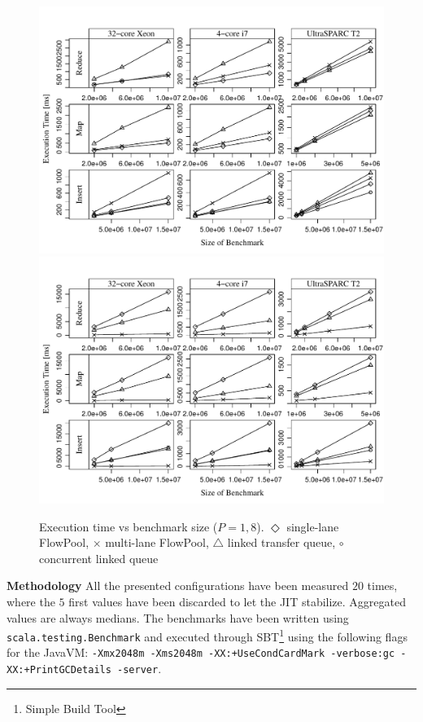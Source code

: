 \documentclass[runningheads,a4paper]{llncs}
\begin{document}
\begin{figure}[ht!]
\includegraphics[width=\textwidth]{../../benchmarks/graphs/size-scaling-par1}
\includegraphics[width=\textwidth]{../../benchmarks/graphs/size-scaling-par8}
\caption{Execution time vs benchmark size ($P = 1, 8$).
  $\Diamond$ single-lane FlowPool,
  $\times$ multi-lane FlowPool,
  $\triangle$ linked transfer queue,
  $\circ$ concurrent linked queue} \label{fig:eval-size-scaling}
\end{figure}

\textbf{Methodology} All the presented configurations have been
measured $20$ times, where the $5$ first values have been discarded to
let the JIT stabilize. Aggregated values are always medians. The
benchmarks have been written using \verb=scala.testing.Benchmark= and
executed through SBT\footnote{Simple Build Tool} using the following
flags for the JavaVM: \texttt{-Xmx2048m -Xms2048m -XX:+UseCondCardMark
  -verbose:gc -XX:+PrintGCDetails -server}.



\end{document}
